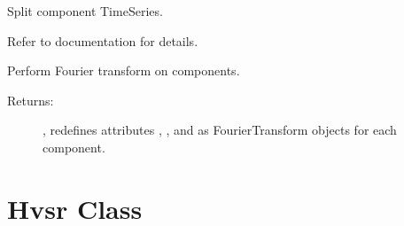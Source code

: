 \documentclass[letterpaper,10pt,english,openany,oneside]{sphinxmanual}
\begin{document}
\begin{fulllineitems}
\begin{fulllineitems}
\end{fulllineitems}


\begin{fulllineitems}
\label{\detokenize{index:hvsrpy.Sensor3c.split}}
Split component TimeSeries.

Refer to  documentation for details.

\end{fulllineitems}


\begin{fulllineitems}
\label{\detokenize{index:hvsrpy.Sensor3c.transform}}
Perform Fourier transform on components.
\begin{description}
\item[{Returns:}] \leavevmode
{}, redefines attributes , , and  as 
FourierTransform objects for each component.

\end{description}

\end{fulllineitems}


\end{fulllineitems}



\chapter{Hvsr Class}
\label{\detokenize{index:hvsr-class}}
\end{document}
